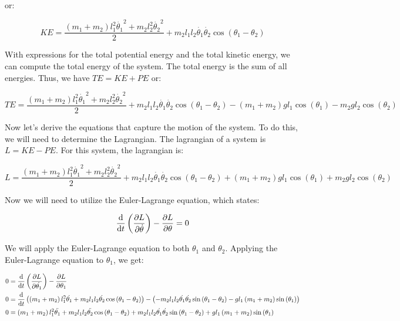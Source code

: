 or:

\begin{equation}
    KE = \frac{\left(m_1 + m_2\right)l_1^2\dot{\theta_1}^2+m_2l_2^2\dot{\theta_2}^2}{2} + m_2l_1l_2\dot{\theta_1}\dot{\theta_2}\cos\left(\theta_1 - \theta_2\right)
    \label{eq:kinetic-energy}
\end{equation}

With expressions for the total potential energy and the total kinetic energy, we can compute the total energy of the system. The total energy is the sum of all energies. Thus, we have $TE=KE+PE$ or:

\begin{equation}
    TE = \frac{\left(m_1 + m_2\right)l_1^2\dot{\theta_1}^2+m_2l_2^2\dot{\theta_2}^2}{2} + m_2l_1l_2\dot{\theta_1}\dot{\theta_2}\cos\left(\theta_1 - \theta_2\right) - \left(m_1 + m_2\right)gl_1\cos\left(\theta_1\right) - m_2gl_2\cos\left(\theta_2\right)
    \label{eq:total-energy}
\end{equation}

Now let's derive the equations that capture the motion of the system. To do this, we will need to determine the Lagrangian. The lagrangian of a system is $L=KE-PE$. For this system, the lagrangian is:

\begin{equation}
    L = \frac{\left(m_1 + m_2\right)l_1^2\dot{\theta_1}^2+m_2l_2^2\dot{\theta_2}^2}{2} + m_2l_1l_2\dot{\theta_1}\dot{\theta_2}\cos\left(\theta_1 - \theta_2\right) + \left(m_1 + m_2\right)gl_1\cos\left(\theta_1\right) + m_2gl_2\cos\left(\theta_2\right)
    \label{eq:lagrangian}
\end{equation}

Now we will need to utilize the Euler-Lagrange equation, which states:

\begin{equation}
    \diff[]{}{t}\left(\pdiff[]{L}{\dot{\theta}}\right) - \pdiff[]{L}{\theta} = 0
    \label{eq:euler-lagrange}
\end{equation}

We will apply the Euler-Lagrange equation to both $\theta_1$ and $\theta_2$. Applying the Euler-Lagrange equation to $\theta_1$, we get:

\begin{align*}
    0 &= \diff[]{}{t}\left(\pdiff[]{L}{\dot{\theta_1}}\right) - \pdiff[]{L}{\theta_1}\\
    0 &= \diff[]{}{t}\left(\left(m_1 + m_2\right)l_1^2\dot{\theta_1} + m_2l_1l_2\dot{\theta_2}\cos\left(\theta_1 - \theta_2\right)\right) - \left(-m_2l_1l_2\dot{\theta_1}\dot{\theta_2}\sin\left(\theta_1 - \theta_2\right) - gl_1\left(m_1 + m_2\right)\sin\left(\theta_1\right)\right)\\
    0 &= \left(m_1 + m_2\right)l_1^2\ddot{\theta_1} + m_2l_1l_2\ddot{\theta_2}\cos\left(\theta_1 - \theta_2\right) + m_2l_1l_2\dot{\theta_1}\dot{\theta_2}\sin\left(\theta_1 - \theta_2\right) + gl_1\left(m_1 + m_2\right)\sin\left(\theta_1\right)
\end{align*}

